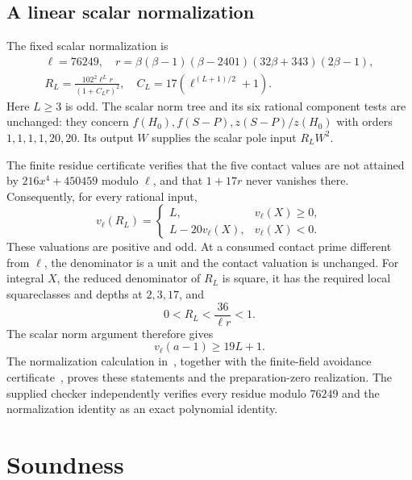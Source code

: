 \documentclass[11pt,a4paper]{article}
\begin{document}
\subsection{A linear scalar normalization}

The fixed scalar normalization is
\begin{equation}\label{eq:normalizer}
 \begin{gathered}
 \ell=76249,\quad
 r=\beta(\beta-1)(\beta-2401)(32\beta+343)(2\beta-1),\\
 R_L=\frac{102^2\ell^L r}{(1+C_Lr)^2},\quad
 C_L=17(\ell^{(L+1)/2}+1).
 \end{gathered}
\end{equation}
Here $L\ge3$ is odd. The scalar norm tree and its six rational
component tests are unchanged: they concern
$f(H_0),f(S-P),z(S-P)/z(H_0)$ with orders
$1,1,1,1,20,20$. Its output $W$ supplies the scalar pole
input $R_LW^2$.

The finite residue certificate verifies that the five contact
values are not attained by $216x^4+450459$ modulo $\ell$,
and that $1+17r$ never vanishes there. Consequently, for every
rational input,
\begin{equation}\label{eq:valuation}
 v_\ell(R_L)=
 \begin{cases}
 L,&v_\ell(X)\ge0,\\
 L-20v_\ell(X),&v_\ell(X)<0.
 \end{cases}
\end{equation}
These valuations are positive and odd. At a consumed contact
prime different from $\ell$, the denominator is a unit and the
contact valuation is unchanged. For integral $X$, the reduced
denominator of $R_L$ is square, it has the required local
squareclasses and depths at $2,3,17$, and
\[
 0<R_L<\frac{36}{\ell r}<1.
\]
The scalar norm argument therefore gives
\begin{equation}\label{eq:depth}
 v_\ell(a-1)\ge19L+1.
\end{equation}
The normalization calculation in~\cite{Aggregate}, together with
the finite-field avoidance certificate~\cite{Normalizer}, proves
these statements and the preparation-zero realization. The supplied
checker independently verifies every residue modulo $76249$
and the normalization identity as an exact polynomial identity.

\section{Soundness}
\end{document}
